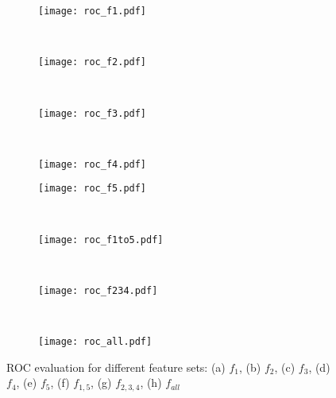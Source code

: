 \documentclass[10pt,conference,compsocconf,letterpaper]{IEEEtran}
\begin{document}
\iffeateval
\begin{figure*}[th]
        \begin{subfigure}[b]{0.24\textwidth}
                \centering
                \texttt{[image: roc\_f1.pdf]}
                \caption{}
                \label{fig:roc_f1}
        \end{subfigure}~ \begin{subfigure}[b]{0.24\textwidth}
                \centering
                \texttt{[image: roc\_f2.pdf]}
                \caption{}
                \label{fig:roc_f2}
        \end{subfigure}      
       ~ \begin{subfigure}[b]{0.24\textwidth}
                \centering
                \texttt{[image: roc\_f3.pdf]}
                \caption{}
                \label{fig:roc_f3}
        \end{subfigure} 
         ~ \begin{subfigure}[b]{0.24\textwidth}
                \centering
                \texttt{[image: roc\_f4.pdf]}
                \caption{}
                \label{fig:roc_f4}
        \end{subfigure}


        \begin{subfigure}[b]{0.24\textwidth}
                \centering
                \texttt{[image: roc\_f5.pdf]}
                \caption{}
                \label{fig:roc_f5}
        \end{subfigure}      
      		~  \begin{subfigure}[b]{0.24\textwidth}
                \centering
                \texttt{[image: roc\_f1to5.pdf]}
                \caption{}
                \label{fig:roc_f1to5}
        \end{subfigure} 	
        		~\begin{subfigure}[b]{0.24\textwidth}
                \centering
                \texttt{[image: roc\_f234.pdf]}
                \caption{}
                \label{fig:rocf234}
        \end{subfigure} 	
  		~      \begin{subfigure}[b]{0.24\textwidth}
                \centering
                \texttt{[image: roc\_all.pdf]}
                \caption{}
                \label{fig:roc_all}
        \end{subfigure} 						 

        \caption{ROC evaluation for different feature sets: (a) $f_1$, (b) $f_2$, (c) $f_3$, (d) $f_4$, (e) $f_5$, (f) $f_{1,5}$, (g) $f_{2,3,4}$, (h) $f_{all}$}\label{fig:roc}
\end{figure*}
\fi
\end{document}
